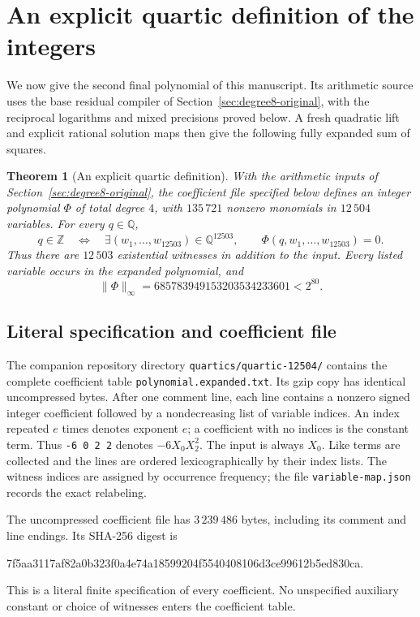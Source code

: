 \documentclass[11pt]{article}
\newtheorem{theorem}{Theorem}[section]
\theoremstyle{definition}
\theoremstyle{remark}
\newcommand{\Q}{\mathbb Q}
\newcommand{\Z}{\mathbb Z}
\begin{document}
\section[An explicit quartic definition]{An explicit quartic definition of the integers}
\label{sec:quartics}

We now give the second final polynomial of this manuscript. Its arithmetic
source uses the base residual compiler of Section~\ref{sec:degree8-original},
with the reciprocal logarithms and mixed precisions proved below. A fresh
quadratic lift and explicit rational solution maps then give the following
fully expanded sum of squares.

\begin{theorem}[An explicit quartic definition]\label{thm:quartic}
With the arithmetic inputs of Section~\ref{sec:degree8-original}, the
coefficient file specified below defines an integer polynomial $\Phi$ of
total degree $4$, with $135\,721$ nonzero monomials in $12\,504$ variables.
For every $q\in\Q$,
\[
 q\in\Z\quad\Longleftrightarrow\quad
 \exists(w_1,\ldots,w_{12503})\in\Q^{12503},\qquad
 \Phi(q,w_1,\ldots,w_{12503})=0.
\]
Thus there are $12\,503$ existential witnesses in addition to the input.
Every listed variable occurs in the expanded polynomial, and
\[
 \|\Phi\|_\infty=685783949153203534233601<2^{80}.
\]
\end{theorem}

\subsection{Literal specification and coefficient file}

The companion repository directory \nolinkurl{quartics/quartic-12504/}
contains the complete coefficient table \nolinkurl{polynomial.expanded.txt}.
Its gzip copy has identical uncompressed bytes. After one comment line,
each line contains a nonzero signed integer coefficient followed by a
nondecreasing list of variable indices. An index repeated $e$ times denotes
exponent $e$; a coefficient with no indices is the constant term. Thus
\texttt{-6 0 2 2} denotes $-6X_0X_2^2$. The input is always $X_0$.
Like terms are collected and the lines are ordered lexicographically by
their index lists. The witness indices are assigned by occurrence frequency;
the file \nolinkurl{variable-map.json} records the exact relabeling.

The uncompressed coefficient file has $3\,239\,486$ bytes, including its
comment and line endings. Its SHA-256 digest is
\begin{center}\footnotesize\ttfamily
7f5aa3117af82a0b323f0a4e74a18599204f5540408106d3ce99612b5ed830ca.
\end{center}
This is a literal finite specification of every coefficient. No unspecified
auxiliary constant or choice of witnesses enters the coefficient table.
\end{document}
